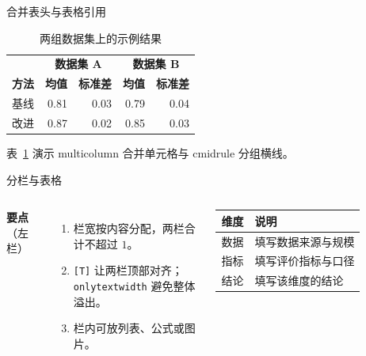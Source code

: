 \begin{frame}{合并表头与表格引用}
  \begin{table}
    \centering
    \small
    \begin{tabular}{@{}lrrrr@{}}
      \toprule
      & \multicolumn{2}{c}{\textbf{数据集 A}} & \multicolumn{2}{c}{\textbf{数据集 B}} \\
      \cmidrule(lr){2-3}\cmidrule(l){4-5}
      \textbf{方法} & \textbf{均值} & \textbf{标准差} & \textbf{均值} & \textbf{标准差} \\
      \midrule
      基线 & 0.81 & 0.03 & 0.79 & 0.04 \\
      改进 & 0.87 & 0.02 & 0.85 & 0.03 \\
      \bottomrule
    \end{tabular}
    \caption{两组数据集上的示例结果}\label{tab:demo}
  \end{table}
  表~\ref{tab:demo} 演示 multicolumn 合并单元格与 cmidrule 分组横线。
\end{frame}

\begin{frame}{分栏与表格}
  \begin{columns}[T,onlytextwidth]
      \textbf{要点}（左栏）
      \begin{enumerate}
        \item 栏宽按内容分配，两栏合计不超过 $1$。
        \item \texttt{[T]} 让两栏顶部对齐；\texttt{onlytextwidth} 避免整体溢出。
        \item 栏内可放列表、公式或图片。
      \end{enumerate}
      \small
      \begin{tabularx}{\linewidth}{@{}lY@{}}
        \toprule
        \textbf{维度} & \textbf{说明} \\
        \midrule
        数据 & 填写数据来源与规模 \\
        指标 & 填写评价指标与口径 \\
        结论 & 填写该维度的结论 \\
        \bottomrule
      \end{tabularx}
  \end{columns}
\end{frame}

